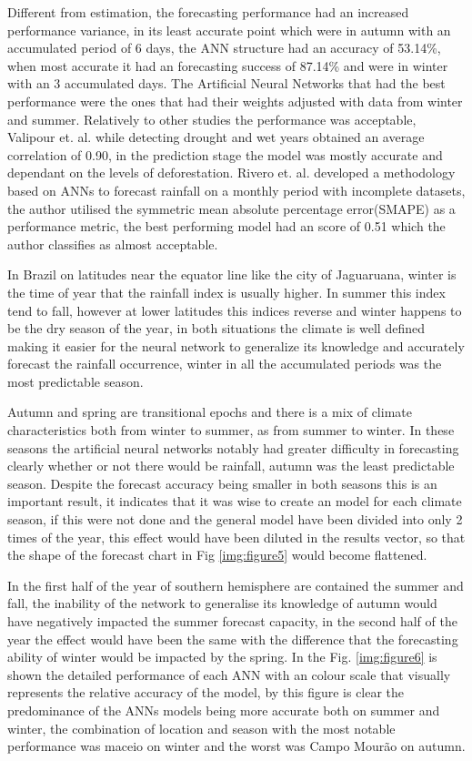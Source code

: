 Different from estimation, the forecasting performance had an increased performance variance, in its least accurate point which were in autumn with an accumulated period of 6 days, the ANN structure had an accuracy of 53.14\%, when most accurate it had an forecasting success of 87.14\% and were in winter with an 3 accumulated days. The Artificial Neural Networks that had the best performance were the ones that had their weights adjusted with data from winter and summer.  Relatively to other studies the performance was acceptable, Valipour et. al.\cite{valipour2016optimization} while detecting drought and wet years obtained an average correlation of 0.90, in the prediction stage the model was mostly accurate and dependant on the levels of deforestation. Rivero et. al. \cite{rivero2015short} developed a methodology based on ANNs to forecast rainfall on a monthly period with incomplete datasets, the author utilised the symmetric mean absolute percentage error(SMAPE) as a performance metric, the best performing model had an score of 0.51 which the author classifies as almost acceptable.

In Brazil on latitudes near the equator line like the city of Jaguaruana, winter is the time of year that the rainfall index is usually higher. In summer this index tend to fall, however at lower latitudes this indices reverse and winter happens to be the dry season of the year, in both situations the climate is well defined making it easier for the neural network to generalize its knowledge and accurately forecast the rainfall occurrence, winter in all the accumulated periods was the most predictable season.
  
Autumn and spring are transitional epochs and there is a mix of climate characteristics both from winter to summer, as from summer to winter. In these seasons the artificial neural networks notably had greater difficulty in forecasting clearly whether or not there would be rainfall, autumn was the least predictable season. 
Despite the forecast accuracy being smaller in both seasons this is an important result, it indicates that it was wise to create an model for each climate season, if this were not done and the general model have been divided into only 2 times of the year, this effect would have been diluted in the results vector, so that the shape of the forecast chart in Fig \ref{img:figure5} would become flattened. 

In the first half of the year of southern hemisphere are contained the summer and fall, the inability of the network to generalise its knowledge of autumn would have negatively impacted the summer forecast capacity, in the second half of the year the effect would have been the same with the difference that the forecasting ability of winter would be impacted by the spring. In the Fig. \ref{img:figure6} is shown the detailed performance of each ANN with an colour scale that visually represents the relative accuracy of the model, by this figure is clear the predominance of the ANNs models being more accurate both on summer and winter, the combination of location and season with the most notable performance was maceio on winter and the worst was Campo Mourão on autumn.  

